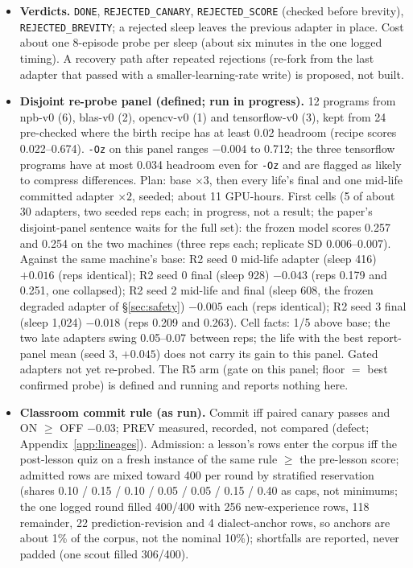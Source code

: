 \documentclass{article}
\begin{document}
\begin{itemize}
\item \textbf{Verdicts.} \texttt{DONE}, \texttt{REJECTED\_CANARY}, \texttt{REJECTED\_SCORE} (checked before brevity), \texttt{REJECTED\_BREVITY}; a rejected sleep leaves the previous adapter in place. Cost about one 8-episode probe per sleep (about six minutes in the one logged timing). A recovery path after repeated rejections (re-fork from the last adapter that passed with a smaller-learning-rate write) is proposed, not built.
\item \textbf{Disjoint re-probe panel (defined; run in progress).} 12 programs from npb-v0 (6), blas-v0 (2), opencv-v0 (1) and tensorflow-v0 (3), kept from 24 pre-checked where the birth recipe has at least 0.02 headroom (recipe scores 0.022--0.674). \texttt{-Oz} on this panel ranges $-0.004$ to 0.712; the three tensorflow programs have at most 0.034 headroom even for \texttt{-Oz} and are flagged as likely to compress differences. Plan: base $\times 3$, then every life's final and one mid-life committed adapter $\times 2$, seeded; about 11 GPU-hours. First cells (5 of about 30 adapters, two seeded reps each; in progress, not a result; the paper's disjoint-panel sentence waits for the full set): the frozen model scores 0.257 and 0.254 on the two machines (three reps each; replicate SD 0.006--0.007). Against the same machine's base: R2 seed 0 mid-life adapter (sleep 416) $+0.016$ (reps identical); R2 seed 0 final (sleep 928) $-0.043$ (reps 0.179 and 0.251, one collapsed); R2 seed 2 mid-life and final (sleep 608, the frozen degraded adapter of \S\ref{sec:safety}) $-0.005$ each (reps identical); R2 seed 3 final (sleep 1{,}024) $-0.018$ (reps 0.209 and 0.263). Cell facts: 1/5 above base; the two late adapters swing 0.05--0.07 between reps; the life with the best report-panel mean (seed 3, $+0.045$) does not carry its gain to this panel. Gated adapters not yet re-probed. The R5 arm (gate on this panel; floor $=$ best confirmed probe) is defined and running and reports nothing here.
\item \textbf{Classroom commit rule (as run).} Commit iff paired canary passes and ON $\ge$ OFF $-0.03$; PREV measured, recorded, not compared (defect; Appendix~\ref{app:lineages}). Admission: a lesson's rows enter the corpus iff the post-lesson quiz on a fresh instance of the same rule $\ge$ the pre-lesson score; admitted rows are mixed toward 400 per round by stratified reservation (shares 0.10 / 0.15 / 0.10 / 0.05 / 0.05 / 0.15 / 0.40 as caps, not minimums; the one logged round filled 400/400 with 256 new-experience rows, 118 remainder, 22 prediction-revision and 4 dialect-anchor rows, so anchors are about 1\% of the corpus, not the nominal 10\%); shortfalls are reported, never padded (one scout filled 306/400).
\end{itemize}
\end{document}

